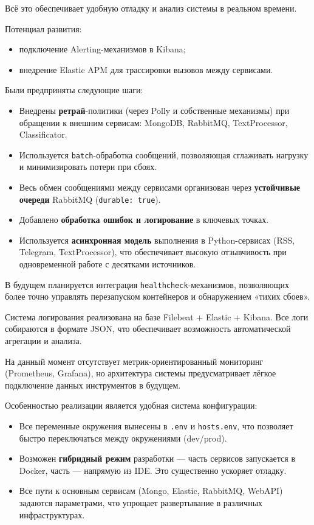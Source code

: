Всё это обеспечивает удобную отладку и анализ системы в реальном времени.

Потенциал развития:
\begin{itemize}
  \item подключение Alerting-механизмов в Kibana;
  \item внедрение Elastic APM для трассировки вызовов между сервисами.
\end{itemize}

Были предприняты следующие шаги:
\begin{itemize}
  \item Внедрены \textbf{ретрай}-политики (через Polly и собственные механизмы) при обращении к внешним сервисам: MongoDB, RabbitMQ, TextProcessor, Classificator.
  \item Используется \texttt{batch}-обработка сообщений, позволяющая сглаживать нагрузку и минимизировать потери при сбоях.
  \item Весь обмен сообщениями между сервисами организован через \textbf{устойчивые очереди} RabbitMQ (\texttt{durable: true}).
  \item Добавлено \textbf{обработка ошибок и логирование} в ключевых точках.
  \item Используется \textbf{асинхронная модель} выполнения в Python-сервисах (RSS, Telegram, TextProcessor), что обеспечивает высокую отзывчивость при одновременной работе с десятками источников.
\end{itemize}

В будущем планируется интеграция \texttt{healthcheck}-механизмов, позволяющих более точно управлять перезапуском контейнеров и обнаружением «тихих сбоев».

Система логирования реализована на базе Filebeat + Elastic + Kibana.
Все логи собираются в формате JSON, что обеспечивает возможность автоматической агрегации и анализа.

На данный момент отсутствует метрик-ориентированный мониторинг (Prometheus, Grafana), но архитектура системы предусматривает лёгкое подключение данных инструментов в будущем.

Особенностью реализации является удобная система конфигурации:
\begin{itemize}
  \item Все переменные окружения вынесены в \texttt{.env} и \texttt{hosts.env}, что позволяет быстро переключаться между окружениями (dev/prod).
  \item Возможен \textbf{гибридный режим} разработки — часть сервисов запускается в Docker, часть — напрямую из IDE. Это существенно ускоряет отладку.
  \item Все пути к основным сервисам (Mongo, Elastic, RabbitMQ, WebAPI) задаются параметрами, что упрощает развертывание в различных инфраструктурах.
\end{itemize}

